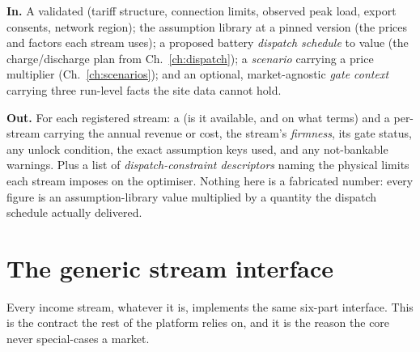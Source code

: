 \begin{contract}
\textbf{In.} A validated  (tariff structure, connection limits, observed peak load, export consents, network region); the assumption library at a pinned version (the prices and factors each stream uses); a proposed battery \emph{dispatch schedule} to value (the charge/discharge plan from Ch.~\ref{ch:dispatch}); a \emph{scenario} carrying a price multiplier (Ch.~\ref{ch:scenarios}); and an optional, market-agnostic \emph{gate context} carrying three run-level facts the site data cannot hold.

\smallskip
\textbf{Out.} For each registered stream: a  (is it available, and on what terms) and a per-stream  carrying the annual revenue or cost, the stream's \emph{firmness}, its gate status, any unlock condition, the exact assumption keys used, and any not-bankable warnings. Plus a list of \emph{dispatch-constraint descriptors} naming the physical limits each stream imposes on the optimiser. Nothing here is a fabricated number: every figure is an assumption-library value multiplied by a quantity the dispatch schedule actually delivered.
\end{contract}

\section{The generic stream interface}

Every income stream, whatever it is, implements the same six-part interface. This is the contract the rest of the platform relies on, and it is the reason the core never special-cases a market.

